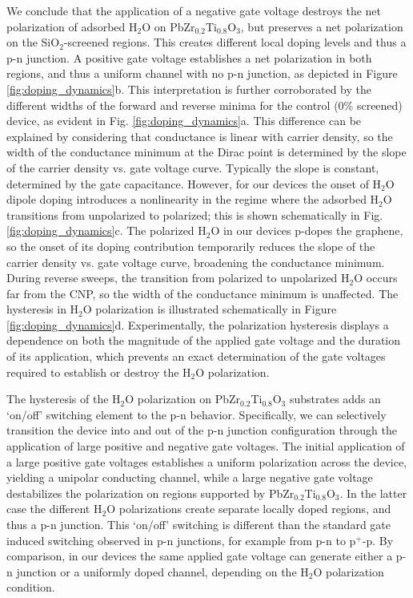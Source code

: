 \documentclass[edeposit,fullpage,draftthesis]{uiucthesis2009}
\begin{document}
We conclude that the application of a negative gate voltage destroys the net polarization of adsorbed H$_2$O on PbZr$_{0.2}$Ti$_{0.8}$O$_3$, but preserves a net polarization on the SiO$_2$-screened regions. This creates different local doping levels and thus a p-n junction. A positive gate voltage establishes a net polarization in both regions, and thus a uniform channel with no p-n junction, as depicted in Figure \ref{fig:doping_dynamics}b. This interpretation is further corroborated by the different widths of the forward and reverse minima for the control (0\% screened) device, as evident in Fig. \ref{fig:doping_dynamics}a. This difference can be explained by considering that conductance is linear with carrier density\cite{Hwang2007}, so the width of the conductance minimum at the Dirac point is determined by the slope of the carrier density vs. gate voltage curve. Typically the slope is constant, determined by the gate capacitance. However, for our devices the onset of H$_2$O dipole doping introduces a nonlinearity in the regime where the adsorbed H$_2$O transitions from unpolarized to polarized; this is shown schematically in Fig. \ref{fig:doping_dynamics}c. The polarized H$_2$O in our devices p-dopes the graphene, so the onset of its doping contribution temporarily reduces the slope of the carrier density vs. gate voltage curve, broadening the conductance minimum. During reverse sweeps, the transition from polarized to unpolarized H$_2$O occurs far from the CNP, so the width of the conductance minimum is unaffected. The hysteresis in H$_2$O polarization is illustrated schematically in Figure \ref{fig:doping_dynamics}d. Experimentally, the polarization hysteresis displays a dependence on both the magnitude of the applied gate voltage and the duration of its application, which prevents an exact determination of the gate voltages required to establish or destroy the H$_2$O polarization.

The hysteresis of the H$_2$O polarization on PbZr$_{0.2}$Ti$_{0.8}$O$_3$ substrates adds an `on/off' switching element to the p-n behavior. Specifically, we can selectively transition the device into and out of the p-n junction configuration through the application of large positive and negative gate voltages. The initial application of a large positive gate voltages establishes a uniform polarization across the device, yielding a unipolar conducting channel, while a large negative gate voltage destabilizes the polarization on regions supported by PbZr$_{0.2}$Ti$_{0.8}$O$_3$. In the latter case the different H$_2$O polarizations create separate locally doped regions, and thus a p-n junction. This `on/off' switching is different than the standard gate induced switching observed in p-n junctions, for example from p-n to p$^+$-p. By comparison, in our devices the same applied gate voltage can generate either a p-n junction or a uniformly doped channel, depending on the H$_2$O polarization condition.
\end{document}
